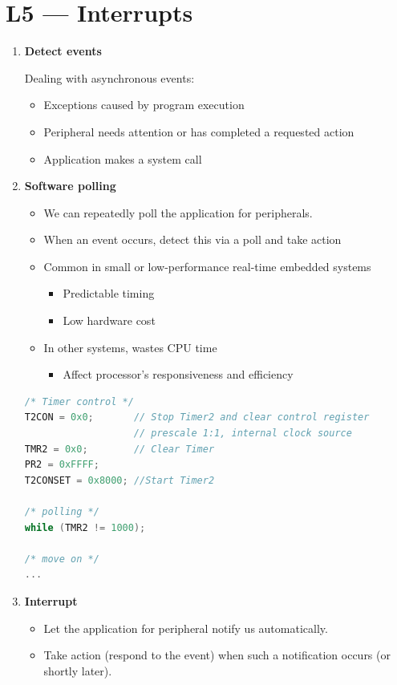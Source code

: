 \documentclass[a4paper]{article}
\begin{document}
\section*{L5 --- Interrupts}
  \begin{enumerate}[label = \arabic*.]
    \item \textbf{Detect events}
      \par Dealing with asynchronous events:
      \begin{itemize}[leftmargin = 1cm]
        \item Exceptions caused by program execution
        \item Peripheral needs attention or has completed a requested action
        \item Application makes a system call
      \end{itemize}


    \item \textbf{Software polling}
      \begin{itemize}[leftmargin = 1cm]
        \item We can repeatedly poll the application for peripherals.
        \item When an event occurs, detect this via a poll and take action
        \item Common in small or low-performance real-time embedded systems
          \begin{itemize}[leftmargin = 1cm]
            \item Predictable timing
            \item Low hardware cost
          \end{itemize}
        \item In other systems, wastes CPU time
          \begin{itemize}[leftmargin = 1cm]
            \item Affect processor's responsiveness and efficiency
          \end{itemize}
      \end{itemize}
      \begin{lstlisting}[language=c]
/* Timer control */
T2CON = 0x0;       // Stop Timer2 and clear control register
                   // prescale 1:1, internal clock source
TMR2 = 0x0;        // Clear Timer
PR2 = 0xFFFF;
T2CONSET = 0x8000; //Start Timer2

/* polling */
while (TMR2 != 1000);

/* move on */
...
      \end{lstlisting}
    \item \textbf{Interrupt}
      \begin{itemize}[leftmargin = 1cm]
        \item Let the application for peripheral notify us automatically.
        \item Take action (respond to the event) when such a notification occurs (or shortly later).
      \end{itemize}


\end{enumerate}
\end{document}
